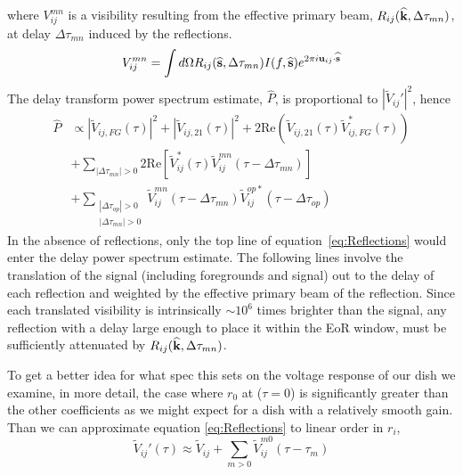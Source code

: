 \documentclass[onecolumn]{emulateapj}
\begin{document}
where $V_{ij}^{mn}$ is a visibility resulting from the effective primary beam, $R_{ij}({\bf \widehat{k}},\Delta \tau_{mn})$, at delay $\Delta \tau_{mn}$ induced by the reflections.
\begin{equation}
V_{ij}^{mn} = \int d \Omega R_{ij}({\bf \widehat{s}},\Delta \tau_{mn}) I(f,{\bf \widehat{s}})e^{2 \pi i {\bf u}_{ij} \cdot {\bf \widehat{s}}}
\end{equation}
The delay transform power spectrum estimate, $\widehat{P}$, is proportional to $|\widetilde{V}_{ij}'|^2$, hence 
\begin{align}\label{eq:Reflections}
\widehat{P} & \propto |\widetilde{V}_{ij,FG}(\tau)|^2 + |\widetilde{V}_{ij,21}(\tau)|^2 + 2 \text{Re}(\widetilde{V}_{ij,21}(\tau)\widetilde{V}_{ij,FG}^*(\tau)) \nonumber \\
&+ \sum_{|\Delta \tau_{mn}| > 0} 2 \text{Re} \left[   \widetilde{V}^*_{ij} (\tau) \widetilde{V}^{mn}_{ij} (\tau - \Delta \tau_{mn})  \right] \nonumber \\
&+ \sum_{\substack{|\Delta \tau_{op}|>0\\|\Delta \tau_{mn}|>0}} \widetilde{V}^{mn}_{ij} (\tau - \Delta \tau_{mn}) \widetilde{V}^{op*}_{ij}(\tau - \Delta \tau_{op})
\end{align}
In the absence of reflections, only the top line of equation~\ref{eq:Reflections} would enter the delay power spectrum estimate. The following lines involve the translation of the signal (including foregrounds and signal) out to the delay of each reflection and weighted by the effective primary beam of the reflection. Since each translated visibility is intrinsically $\sim 10^6$ times brighter than the signal, any reflection with a delay large enough to place it within the EoR window, must be sufficiently attenuated by $R_{ij}({\bf \widehat{k}},\Delta \tau_{mn})$.%

To get a better idea for what spec this sets on the voltage response of our dish we examine, in more detail, the case where $r_0$ at ($\tau=0$) is significantly greater than the other coefficients as we might expect for a dish with a relatively smooth gain. Than we can approximate equation \ref{eq:Reflections} to linear order in $r_i$,
\begin{equation}
\widetilde{V}_{ij}'(\tau) \approx \widetilde{V}_{ij} + \sum_{m>0} \widetilde{V}_{ij}^{m0} (\tau -  \tau_m)
\end{equation}
\end{document}
